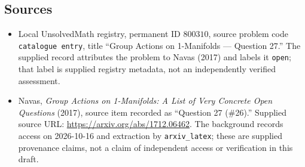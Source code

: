 \documentclass[11pt]{article}
\begin{document}
\subsection{Sources}
\begin{itemize}
\item Local UnsolvedMath registry, permanent ID \(800310\), source problem code \texttt{catalogue entry}, title ``Group Actions on 1-Manifolds --- Question 27.'' The supplied record attributes the problem to Navas (2017) and labels it \texttt{open}; that label is supplied registry metadata, not an independently verified assessment.
\item Navas, \emph{Group Actions on 1-Manifolds: A List of Very Concrete Open Questions} (2017), source item recorded as ``Question 27 (\#26).'' Supplied source URL: \url{https://arxiv.org/abs/1712.06462}. The background records access on 2026-10-16 and extraction by \texttt{arxiv\_latex}; these are supplied provenance claims, not a claim of independent access or verification in this draft.
\end{itemize}
\end{document}

